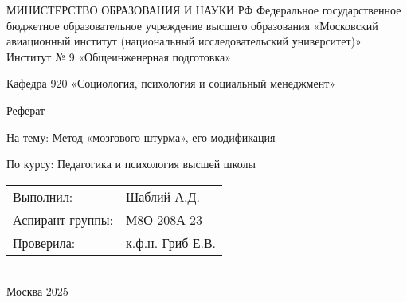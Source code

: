 \vskip 50mm
\thispagestyle{empty}
\begin{center}
	\large
	МИНИСТЕРСТВО ОБРАЗОВАНИЯ И НАУКИ РФ
	\vskip 10mm
	Федеральное государственное бюджетное образовательное учреждение высшего образования «Московский авиационный институт (национальный исследовательский университет)»
	\vskip 30mm
	Институт № 9 «Общеинженерная подготовка»

	Кафедра 920 «Социология, психология и социальный менеджмент»

	\vskip 30mm
	Реферат

	На тему: Метод «мозгового штурма», его модификация

	По курсу: Педагогика и психология высшей школы

	\vskip 50mm
	\begin{tabularx}{\textwidth}{ >{\raggedright\arraybackslash}X >{\raggedleft\arraybackslash}X }
    
	Выполнил: & Шаблий А.Д. \\
	Аспирант группы: & М8О-208А-23 \\
	Проверила: & к.ф.н. Гриб Е.В. \\
		
	\end{tabularx}\\[7\baselineskip]
	Москва 2025
\end{center}
